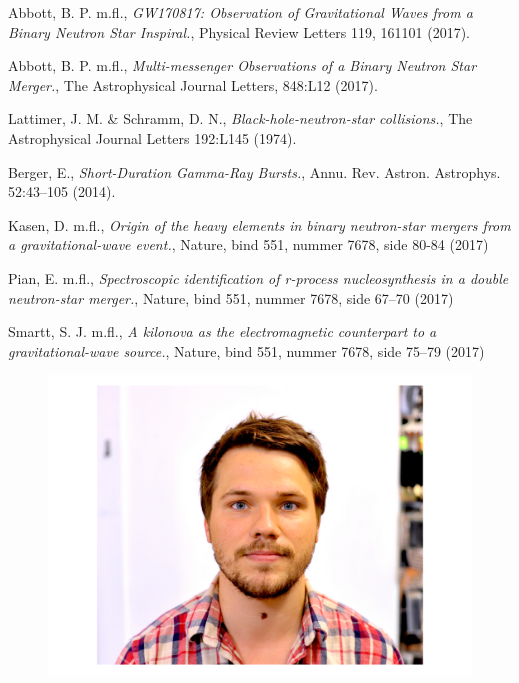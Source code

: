 \documentclass[twocolumn]{article}
\begin{document}
\begin{thebibliography}{9}
Abbott, B. P. m.fl., \emph{GW170817: Observation of Gravitational Waves from a Binary Neutron Star Inspiral.}, Physical Review Letters 119, 161101 (2017).

Abbott, B. P. m.fl., \emph{Multi-messenger Observations of a Binary Neutron Star Merger.}, The Astrophysical Journal Letters, 848:L12 (2017).

Lattimer, J. M. \& Schramm, D. N., \emph{Black-hole-neutron-star collisions.}, The Astrophysical Journal Letters 192:L145 (1974).

Berger, E., \emph{Short-Duration Gamma-Ray Bursts.}, Annu. Rev. Astron. Astrophys. 52:43–105 (2014).

Kasen, D. m.fl., \emph{Origin of the heavy elements in binary neutron-star
mergers from a gravitational-wave event.}, Nature, bind 551, nummer 7678, side 80-84 (2017)

Pian, E. m.fl., \emph{Spectroscopic identification of r-process nucleosynthesis in a double neutron-star merger.}, Nature, bind 551, nummer 7678, side 67–70 (2017)

Smartt, S. J. m.fl., \emph{A kilonova as the electromagnetic counterpart to a gravitational-wave source.}, Nature, bind 551, nummer 7678, side 75–79 (2017)









\end{thebibliography}

\captionsetup[figure]{labelformat=empty}

\begin{figure}[!htbp]
\begin{center}
\includegraphics[width=0.5 \columnwidth]{me}
\end{center}
\end{figure}
\end{document}
